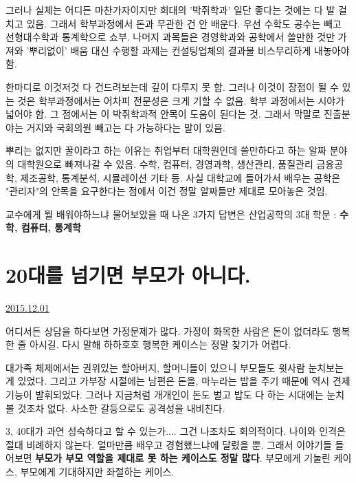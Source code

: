 그러나 실체는 어디든 마찬가자이지만 희대의 '박쥐학과'
일단 좋다는 것에는 다 발 걸치고 있음. 그래서 학부과정에서 돈과 무관한 건 안 배운다.
우선 수학도 공수는 빼고 선형대수학과 통계학으로 쇼부.
나머지 과목들은 경영학과와 공학에서 쓸만한 것만 가져와 '뿌리없이' 배움
대신 수행할 과제는 컨설팅업체의 결과물 비스무리하게 내놓아야함.
\vspace{5mm}

한마디로 이것저것 다 건드려보는데 깊이 다루지 못 함.
그러나 이것이 장점이 될 수 있는 것은 학부과정에서는 어차피 전문성은 크게 기할 수 없음.
학부 과정에서는 시야가 넓어야 함. 그 점에서는 이 박쥐학과적 안목이 도움이 된다는 것.
그래서 막말로 진출분야는 거지와 국회의원 빼고는 다 가능하다는 말이 있음.
\vspace{5mm}

뿌리는 없지만 꿀이라고 하는 이유는 취업부터 대학원인데 쓸만하다고 하는 알짜 분야의 대학원으로 빠져나갈 수 있음.
수학, 컴퓨터, 경영과학, 생산관리, 품질관리 금융공학, 제조공학, 통계분석, 시뮬레이션 기타 등.
사실 대학교에 들어가서 배우는 공학은 "관리자"의 안목을 요구한다는 점에서 이건 정말 알짜들만 제대로 모아놓은 것임.
\vspace{5mm}

교수에게 뭘 배워야하느냐 물어보았을 때 나온 3가지 답변은
산업공학의 3대 학문 : \textbf{수학, 컴퓨터, 통계학}
\vspace{5mm}




\section{20대를 넘기면 부모가 아니다.}
\href{https://www.kockoc.com/Apoc/521648}{2015.12.01}

\vspace{5mm}

어디서든 상담을 하다보면 가정문제가 많다.
가정이 화목한 사람은 돈이 없더라도 행복한 줄 아시길.
다시 말해 하하호호 행복한 케이스는 정말 찾기가 어렵다.
\vspace{5mm}

대가족 체제에서는 권위있는 할아버지, 할머니들이 있으니 부모들도 윗사람 눈치보는 게 있었다.
그리고 가부장 시절에는 남편은 돈을, 마누라는 밥을 주기 때문에 역시 견제기능이 발휘되었다.
그러나 지금처럼 개개인이 돈도 벌고 밥도 다 하는 시대에는 눈치볼 것조차 없다.
사소한 갈등으로도 공격성을 내비친다.
\vspace{5mm}

3, 40대가 과연 성숙하다고 할 수 있는가.... 그건 나조차도 회의적이다.
나이와 인격은 절대 비례하지 않는다. 얼마만큼 배우고 경험했느냐에 달렸을 뿐.
그래서 이야기들 들어보면 \textbf{부모가 부모 역할을 제대로 못 하는 케이스도 정말 많다}.
부모에게 기눌린 케이스, 부모에게 기대하지만 좌절하는 케이스.
\vspace{5mm}

